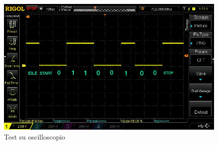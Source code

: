 \documentclass[a4paper, titlepage]{article}
\begin{document}
\begin{figure}[h]
    \centering
   \includegraphics[scale=0.5]{trasmissione su oscilloscopio.jpeg}
    \caption{Test su oscilloscopio}
    \label{fig:test_osc}
\end{figure}
\end{document}
